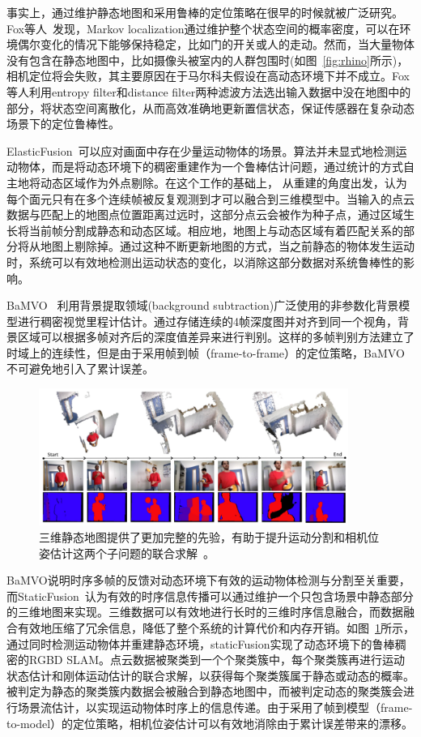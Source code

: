 事实上，通过维护静态地图和采用鲁棒的定位策略在很早的时候就被广泛研究。Fox等人~\cite{fox1999}发现，Markov localization通过维护整个状态空间的概率密度，可以在环境偶尔变化的情况下能够保持稳定，比如门的开关或人的走动。然而，当大量物体没有包含在静态地图中，比如摄像头被室内的人群包围时(如图~\ref{fig:rhino}所示)，相机定位将会失败，其主要原因在于马尔科夫假设在高动态环境下并不成立。Fox等人利用entropy filter和distance filter两种滤波方法选出输入数据中没在地图中的部分，将状态空间离散化，从而高效准确地更新置信状态，保证传感器在复杂动态场景下的定位鲁棒性。

ElasticFusion~\cite{elasticFusion}可以应对画面中存在少量运动物体的场景。算法并未显式地检测运动物体，而是将动态环境下的稠密重建作为一个鲁棒估计问题，通过统计的方式自主地将动态区域作为外点剔除。在这个工作的基础上，\cite{keller13_3dv} 从重建的角度出发，认为每个面元只有在多个连续帧被反复观测到才可以融合到三维模型中。当输入的点云数据与匹配上的地图点位置距离过远时，这部分点云会被作为种子点，通过区域生长将当前帧分割成静态和动态区域。相应地，地图上与动态区域有着匹配关系的部分将从地图上剔除掉。通过这种不断更新地图的方式，当之前静态的物体发生运动时，系统可以有效地检测出运动状态的变化，以消除这部分数据对系统鲁棒性的影响。

BaMVO~\cite{BaMVO} 利用背景提取领域(background subtraction)广泛使用的非参数化背景模型进行稠密视觉里程计估计。通过存储连续的4帧深度图并对齐到同一个视角，背景区域可以根据多帧对齐后的深度值差异来进行判别。这样的多帧判别方法建立了时域上的连续性，但是由于采用帧到帧（frame-to-frame）的定位策略，BaMVO不可避免地引入了累计误差。

\begin{figure}[!htbp]
	\centering
	\includegraphics[width=0.9\textwidth]{figs/2-1/staticFusion.jpeg}
	\caption{三维静态地图提供了更加完整的先验，有助于提升运动分割和相机位姿估计这两个子问题的联合求解~\cite{staticFusion}。}
	\label{fig:staticFusion}
\end{figure}

BaMVO说明时序多帧的反馈对动态环境下有效的运动物体检测与分割至关重要，而StaticFusion~\cite{staticFusion}认为有效的时序信息传播可以通过维护一个只包含场景中静态部分的三维地图来实现。三维数据可以有效地进行长时的三维时序信息融合，而数据融合有效地压缩了冗余信息，降低了整个系统的计算代价和内存开销。如图~\ref{fig:staticFusion}所示，通过同时检测运动物体并重建静态环境，staticFusion实现了动态环境下的鲁棒稠密的RGBD SLAM。点云数据被聚类到一个个聚类簇中，每个聚类簇再进行运动状态估计和刚体运动估计的联合求解，以获得每个聚类簇属于静态或动态的概率。被判定为静态的聚类簇内数据会被融合到静态地图中，而被判定动态的聚类簇会进行场景流估计，以实现运动物体时序上的信息传递。由于采用了帧到模型（frame-to-model）的定位策略，相机位姿估计可以有效地消除由于累计误差带来的漂移。

